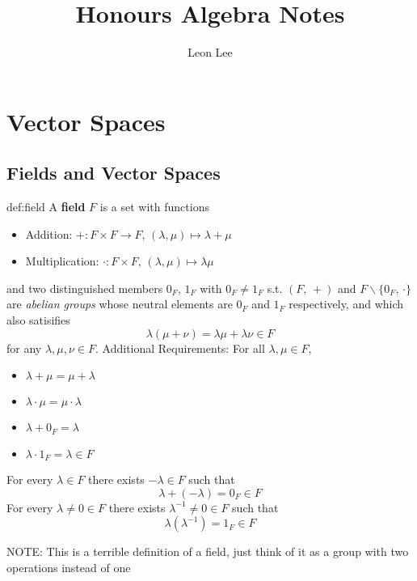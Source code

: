\documentclass{article}
\title{Honours Algebra Notes}
\author{Leon Lee}
\begin{document}
\maketitle
\newpage
\tableofcontents
\newpage

\section{Vector Spaces}
\subsection{Fields and Vector Spaces}

\begin{dfn}{def:field}{}
    A \textbf{field} $F$ is a set with functions
    \begin{itemize}
        \item Addition: $+ : F \times F \to F,\,(\lambda, \mu) \mapsto \lambda + \mu$
        \item Multiplication: $\cdot : F \times F,\, (\lambda, \mu) \mapsto \lambda\mu$
    \end{itemize}
    and two distinguished members $0_{F},\, 1_{F}$ with $0_{F}\ne 1_{F}$ s.t. $(F,\, +)$ and $F \backslash \{0_{F},\, \cdot\}$ are \textit{abelian groups} whose neutral elements are $0_{F}$ and $1_{F}$ respectively, and which also satisifies
    \[\lambda(\mu + \nu) = \lambda\mu + \lambda\nu \in F\]
    for any $\lambda, \mu, \nu\in F$. 
    Additional Requirements: For all $\lambda,\mu\in F$,
    \begin{itemize}
        \item $\lambda + \mu = \mu + \lambda$
        \item $\lambda \cdot \mu = \mu \cdot \lambda$
        \item $\lambda + 0_{F} = \lambda$
        \item $\lambda \cdot 1_{F} = \lambda\in F$
    \end{itemize}
    For every $\lambda\in F$ there exists $-\lambda \in F$ such that
    \[\lambda + (-\lambda) = 0_{F} \in F\]
    For every $\lambda \ne 0 \in F$ there exists $\lambda^{-1}\ne 0\in F$ such that
    \[\lambda(\lambda^{-1}) = 1_{F}\in F\]

    NOTE: This is a terrible definition of a field, just think of it as a group with two operations instead of one
\end{dfn}
\end{document}
